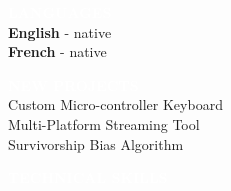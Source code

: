 \documentclass[9pt]{src/developercv} %
\begin{document}

\begin{minipage}[t]{0.3\textwidth}
	\vspace{-\baselineskip}

	\vspace{\baselineskip} %
	\colorbox{cyan700}{\textcolor{white}{\MakeUppercase{\textbf{Languages}}}}\\%
	
	\textbf{English} - native\\
	\textbf{French} - native
\end{minipage}
\hfill
\begin{minipage}[t]{0.3\textwidth}
	\vspace{-\baselineskip}
	
	\vspace{\baselineskip} %
	\colorbox{cyan600}{\textcolor{white}{\MakeUppercase{\textbf{New Projects}}}}\\%
	
	Custom Micro-controller Keyboard\\
	Multi-Platform Streaming Tool\\
	Survivorship Bias Algorithm
\end{minipage}
\hfill
\begin{minipage}[t]{0.3\textwidth}
	\vspace{-\baselineskip}
	
	\vspace{\baselineskip} %
	\colorbox{cyan500}{\textcolor{white}{\MakeUppercase{\textbf{Technical Skills}}}}\\%

\end{minipage}

\end{document}
